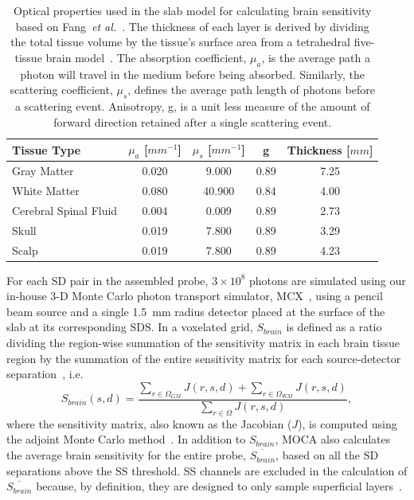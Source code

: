 \begin{table}
    \centering
    \caption{Optical properties used in the slab model for calculating brain sensitivity based on Fang~\emph{et al.}~\cite{Fang2010}. The thickness of each layer is derived by dividing the total tissue volume by the tissue's surface area from a tetrahedral five-tissue brain model~\cite{Sanchez2012}. The absorption coefficient, $\mu_{a}$, is the average path a photon will travel in the medium before being absorbed. Similarly, the scattering coefficient, $\mu_{s}$, defines the average path length of photons before a scattering event. Anisotropy, g, is a unit less measure of the amount of forward direction retained after a single scattering event.}
    \label{tab:opticalproperties}
        \begin{tabular}{@{}lcccc@{}}
        \toprule
        Tissue Type  & $\mu_{a}$ [$mm^{-1}$] & $\mu_{s}$ [$mm^{-1}$] & g    & Thickness [$mm$] \\ \midrule
        Gray Matter                     & 0.020      & 9.000      & 0.89 & 7.25           \\
        White Matter                    & 0.080      & 40.900     & 0.84 & 4.00           \\
        Cerebral Spinal Fluid           & 0.004      & 0.009      & 0.89 & 2.73           \\
        Skull                           & 0.019      & 7.800      & 0.89 & 3.29           \\
        Scalp                           & 0.019      & 7.800      & 0.89 & 4.23           \\ \bottomrule
        \end{tabular}
\end{table}

For each \ac{SD} pair in the assembled probe, $3\times10^{8}$ photons are simulated using our in-house 3-D Monte Carlo photon transport simulator, \ac{MCX}~\cite{Fang2009}, using a pencil beam source and a single 1.5~mm radius detector placed at the surface of the slab at its corresponding \ac{SDS}. In a voxelated grid, $S_{brain}$ is defined as a ratio dividing the region-wise summation of the sensitivity matrix in each brain tissue region by the summation of the entire sensitivity matrix for each source-detector separation~\cite{Brigadoi2015}, i.e.
\begin{equation}
    \label{eq:fov}
    S_{brain}(s,d) = \frac{\sum_{r\in\Omega_{GM}}J(r,s,d) + \sum_{r\in\Omega_{WM}}J(r,s,d)} {\sum_{r\in\Omega}J(r,s,d)},
\end{equation}
where the sensitivity matrix, also known as the Jacobian ($J$), is computed using the adjoint Monte Carlo method~\cite{Yao2018}. In addition to $S_{brain}$, \ac{MOCA} also calculates the average brain sensitivity for the entire probe, $\overline{S_{brain}}$, based on all the \ac{SD} separations above the \ac{SS} threshold. \ac{SS} channels are excluded in the calculation of $\overline{S_{brain}}$ because, by definition, they are designed to only sample superficial layers~\cite{Brigadoi2015}.

